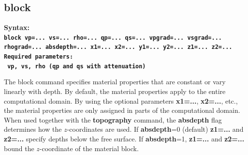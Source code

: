 \documentclass[11pt]{report}
\begin{document}
{%
\subsection{block}
\label{keyword:block}
\begin{flushleft}\bf
	Syntax:\\
	\tt block
	vp=... vs=... rho=... qp=... qs=... vpgrad=... vsgrad=... rhograd=... absdepth=... x1=... x2=... y1=... y2=... z1=... z2=...\\
	\bf
	Required parameters:\\
	\tt
	vp, vs, rho  (qp and qs with attenuation)
\end{flushleft}
%
The block command specifies material properties that are constant or vary linearly with depth. By
default, the material properties apply to the entire computational domain. By using the optional
parameters {\bf x1=...}, {\bf x2=...}, etc., the material properties are only assigned in parts of
the computational domain. When used together with the {\bf topography} command, the {\bf absdepth}
flag determines how the $z$-coordinates are used. If {\bf absdepth}=0 (default) {\bf z1=...} and
	{\bf z2=...} specify depths below the free surface. If {\bf absdepth}=1,  {\bf z1=...} and
	{\bf z2=...} bound the $z$-coordinate of the material block.

}
\end{document}
